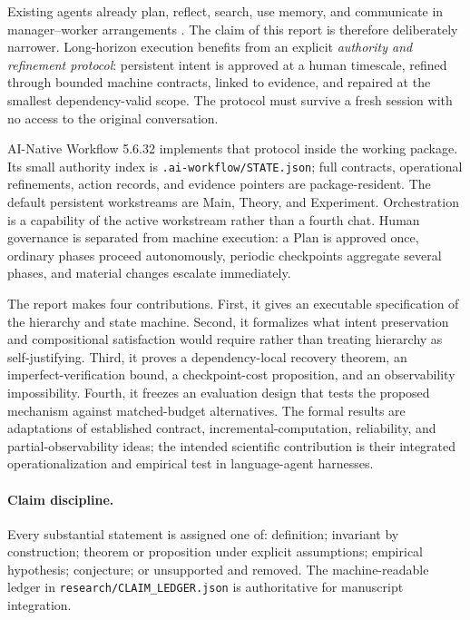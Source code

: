 \documentclass[11pt]{article}
\begin{document}
Existing agents already plan, reflect, search, use memory, and communicate in manager--worker arrangements \citep{yao2023react,yao2023tot,besta2024got,shinn2023reflexion,wu2023autogen,hong2024metagpt}. The claim of this report is therefore deliberately narrower. Long-horizon execution benefits from an explicit \emph{authority and refinement protocol}: persistent intent is approved at a human timescale, refined through bounded machine contracts, linked to evidence, and repaired at the smallest dependency-valid scope. The protocol must survive a fresh session with no access to the original conversation.

AI-Native Workflow 5.6.32 implements that protocol inside the working package. Its small authority index is \texttt{.ai-workflow/STATE.json}; full contracts, operational refinements, action records, and evidence pointers are package-resident. The default persistent workstreams are Main, Theory, and Experiment. Orchestration is a capability of the active workstream rather than a fourth chat. Human governance is separated from machine execution: a Plan is approved once, ordinary phases proceed autonomously, periodic checkpoints aggregate several phases, and material changes escalate immediately.

The report makes four contributions. First, it gives an executable specification of the hierarchy and state machine. Second, it formalizes what intent preservation and compositional satisfaction would require rather than treating hierarchy as self-justifying. Third, it proves a dependency-local recovery theorem, an imperfect-verification bound, a checkpoint-cost proposition, and an observability impossibility. Fourth, it freezes an evaluation design that tests the proposed mechanism against matched-budget alternatives. The formal results are adaptations of established contract, incremental-computation, reliability, and partial-observability ideas; the intended scientific contribution is their integrated operationalization and empirical test in language-agent harnesses.

\paragraph{Claim discipline.} Every substantial statement is assigned one of: definition; invariant by construction; theorem or proposition under explicit assumptions; empirical hypothesis; conjecture; or unsupported and removed. The machine-readable ledger in \texttt{research/CLAIM\_LEDGER.json} is authoritative for manuscript integration.
\end{document}
